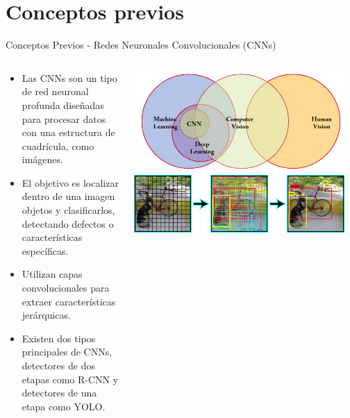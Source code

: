 \documentclass[spanish]{beamer}
\begin{document}
\section{Conceptos previos}
\begin{frame}{Conceptos Previos - Redes Neuronales Convolucionales (CNNs)}
    \begin{columns}
        \begin{column}{0.5\textwidth}
            \begin{itemize}
                \item Las CNNs son un tipo de red neuronal profunda diseñadas para procesar datos con una estructura de cuadrícula, como imágenes.
                \item El objetivo es localizar dentro de una imagen objetos y clasificarlos, detectando defectos o características específicas.
                \item Utilizan capas convolucionales para extraer características jerárquicas.
                \item Existen dos tipos principales de CNNs, detectores de dos etapas como R-CNN y detectores de una etapa como YOLO.
                    
            \end{itemize}
        \end{column}
        \begin{column}{0.5\textwidth}
            \includegraphics[width=0.95\textwidth]{images/conceptos_previos/diagrama_de_Venn_inteligencia_artificial.png}
            \includegraphics[width=0.95\textwidth]{images/conceptos_previos/yolo.png}
        \end{column}
    \end{columns}
\end{frame}
\end{document}
